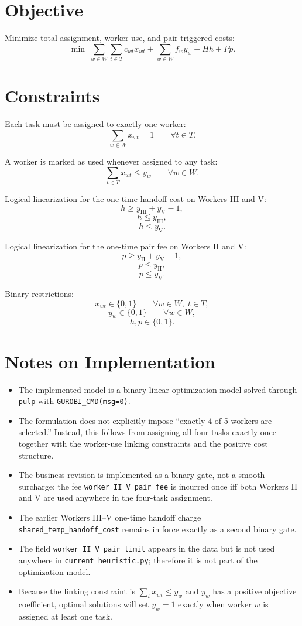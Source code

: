 \section*{Objective}

Minimize total assignment, worker-use, and pair-triggered costs:
\[
\min \;
\sum_{w \in W}\sum_{t \in T} c_{wt} x_{wt}
+ \sum_{w \in W} f_w y_w
+ H h
+ P p.
\]

\section*{Constraints}

Each task must be assigned to exactly one worker:
\[
\sum_{w \in W} x_{wt} = 1
\qquad \forall t \in T.
\]

A worker is marked as used whenever assigned to any task:
\[
\sum_{t \in T} x_{wt} \le y_w
\qquad \forall w \in W.
\]

Logical linearization for the one-time handoff cost on Workers III and V:
\[
h \ge y_{\mathrm{III}} + y_{\mathrm{V}} - 1,
\]
\[
h \le y_{\mathrm{III}},
\]
\[
h \le y_{\mathrm{V}}.
\]

Logical linearization for the one-time pair fee on Workers II and V:
\[
p \ge y_{\mathrm{II}} + y_{\mathrm{V}} - 1,
\]
\[
p \le y_{\mathrm{II}},
\]
\[
p \le y_{\mathrm{V}}.
\]

Binary restrictions:
\[
x_{wt} \in \{0,1\}
\qquad \forall w \in W,\; t \in T,
\]
\[
y_w \in \{0,1\}
\qquad \forall w \in W,
\]
\[
h,p \in \{0,1\}.
\]

\section*{Notes on Implementation}

\begin{itemize}
    \item The implemented model is a binary linear optimization model solved through \texttt{pulp} with \texttt{GUROBI\_CMD(msg=0)}.
    \item The formulation does not explicitly impose ``exactly 4 of 5 workers are selected.'' Instead, this follows from assigning all four tasks exactly once together with the worker-use linking constraints and the positive cost structure.
    \item The business revision is implemented as a binary gate, not a smooth surcharge: the fee \texttt{worker\_II\_V\_pair\_fee} is incurred once iff both Workers II and V are used anywhere in the four-task assignment.
    \item The earlier Workers III--V one-time handoff charge \texttt{shared\_temp\_handoff\_cost} remains in force exactly as a second binary gate.
    \item The field \texttt{worker\_II\_V\_pair\_limit} appears in the data but is not used anywhere in \texttt{current\_heuristic.py}; therefore it is not part of the optimization model.
    \item Because the linking constraint is $\sum_{t} x_{wt} \le y_w$ and $y_w$ has a positive objective coefficient, optimal solutions will set $y_w=1$ exactly when worker $w$ is assigned at least one task.
\end{itemize}
